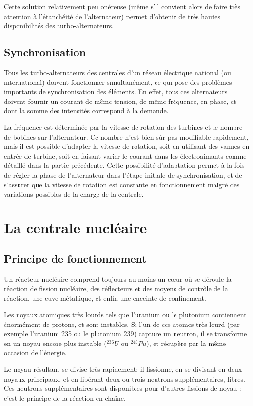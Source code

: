 \documentclass[12pt,a4paper,oneside,openany]{memoir}
\begin{document}
Cette solution relativement peu onéreuse (même s'il convient alors de faire très attention à l'étanchéité de l'alternateur) permet d'obtenir de très hautes disponibilités des turbo-alternateurs.


\section{Synchronisation}
Tous les turbo-alternateurs des centrales d'un réseau électrique national (ou international) doivent fonctionner simultanément, ce qui pose des problèmes importants de synchronisation des éléments. En effet, tous ces alternateurs doivent fournir un courant de même tension, de même fréquence, en phase, et dont la somme des intensités correspond à la demande.

La fréquence est déterminée par la vitesse de rotation des turbines et le nombre de bobines sur l'alternateur. Ce nombre n'est bien sûr pas modifiable rapidement, mais il est possible d'adapter la vitesse de rotation, soit en utilisant des vannes en entrée de turbine, soit en faisant varier le courant dans les électroaimants comme détaillé dans la partie précédente. Cette possibilité d'adaptation permet à la fois de régler la phase de l'alternateur dans l'étape initiale de synchronisation, et de s'assurer que la vitesse de rotation est constante en fonctionnement malgré des variations possibles de la charge de la centrale.


\chapter{La centrale nucléaire}

\section{Principe de fonctionnement}
Un réacteur nucléaire comprend toujours au moins un cœur où se déroule la réaction de fission nucléaire, des réflecteurs et des moyens de contrôle de la réaction, une cuve métallique, et enfin une enceinte de confinement.

Les noyaux atomiques très lourds tels que l'uranium ou le plutonium contiennent énormément de protons, et sont instables. Si l'un de ces atomes très lourd (par exemple l'uranium 235 ou le plutonium 239) capture un neutron, il se transforme en un noyau encore plus instable (${}^{236}U$ ou ${}^{240}Pu$), et récupère par la même occasion de l'énergie.

Le noyau résultant se divise très rapidement: il fissionne, en se divisant en deux noyaux principaux, et en libérant deux ou trois neutrons supplémentaires, libres. Ces neutrons supplémentaires sont disponibles pour d'autres fissions de noyau : c'est le principe de la réaction en chaîne.
\end{document}

